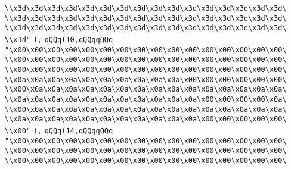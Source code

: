 \verb|\\x3d\x3d\x3d\x3d\x3d\x3d\x3d\x3d\x3d\x3d\x3d\x3d\x3d\x3d\x3d\x3d\|\newline
\verb|\\x3d\x3d\x3d\x3d\x3d\x3d\x3d\x3d\x3d\x3d\x3d\x3d\x3d\x3d\x3d\x3d\|\newline
\verb|\\x3d\x3d\x3d\x3d\x3d\x3d\x3d\x3d\x3d\x3d\x3d\x3d\x3d\x3d\x3d\x3d\|\newline
\verb|\\x3d"|\newline
\verb|),|\newline
\verb|qQQq(10,qQQqqQQq|\newline
\verb|"\x00\x00\x00\x00\x00\x00\x00\x00\x00\x00\x00\x00\x00\x00\x00\x00\|\newline
\verb|\\x00\x00\x00\x00\x00\x00\x00\x00\x00\x00\x00\x00\x00\x00\x00\x00\|\newline
\verb|\\x00\x00\x00\x00\x00\x00\x00\x00\x00\x00\x00\x00\x00\x00\x00\x00\|\newline
\verb|\\x0a\x0a\x0a\x0a\x0a\x0a\x0a\x0a\x0a\x0a\x00\x00\x00\x00\x00\x00\|\newline
\verb|\\x00\x0a\x0a\x0a\x0a\x0a\x0a\x0a\x0a\x0a\x0a\x0a\x0a\x0a\x0a\x0a\|\newline
\verb|\\x0a\x0a\x0a\x0a\x0a\x0a\x0a\x0a\x0a\x0a\x0a\x00\x00\x00\x00\x0a\|\newline
\verb|\\x00\x0a\x0a\x0a\x0a\x0a\x0a\x0a\x0a\x0a\x0a\x0a\x0a\x0a\x0a\x0a\|\newline
\verb|\\x0a\x0a\x0a\x0a\x0a\x0a\x0a\x0a\x0a\x0a\x0a\x00\x00\x00\x00\x00\|\newline
\verb|\\x00"|\newline
\verb|),|\newline
\verb|qQQq(14,qQQqqQQq|\newline
\verb|"\x00\x00\x00\x00\x00\x00\x00\x00\x00\x00\x00\x00\x00\x00\x00\x00\|\newline
\verb|\\x00\x00\x00\x00\x00\x00\x00\x00\x00\x00\x00\x00\x00\x00\x00\x00\|\newline
\verb|\\x00\x00\x00\x00\x00\x00\x00\x00\x00\x00\x00\x00\x00\x00\x00\x00\|\newline
